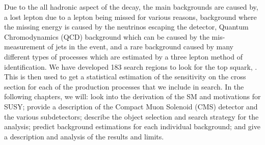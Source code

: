 Due to the all hadronic aspect of the decay, the main backgrounds are caused by, a lost lepton due to a lepton being missed for various reasons, \Znunu{} background where the missing energy is caused by the neutrinos escaping the detector, Quantum Chromodynamics (QCD) background which can be caused by the mis-measurement of jets in the event, and a rare background caused by many different types of processes which are estimated by a three lepton method of identification. We have developed 183 search regions to look for the top squark, \st{}. This is then used to get a statistical estimation of the sensitivity on the cross section for each of the production processes that we include in search. In the following chapters, we will: look into the derivation of the SM and motivations for SUSY; provide a description of the Compact Muon Solenoid (CMS) detector and the various subdetectors; describe the object selection and search strategy for the analysis; predict background estimations for each individual background; and give a description and analysis of the results and limits. 

